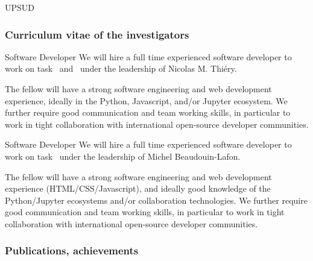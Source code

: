 \begin{sitedescription}{UPSUD}
\subsubsection*{Curriculum vitae of the investigators}





\begin{participant}[type=R,PM=21]{Software Developer}
  We will hire a full time experienced software developer to work on
  task~ and~ %
  under the leadership of Nicolas M. Thiéry.

  The fellow will have a strong software engineering and web
  development experience, ideally in the Python, Javascript, and/or
  Jupyter ecosystem. We further require good communication and team
  working skills, in particular to work in tight collaboration with
  international open-source developer communities.
\end{participant}

\begin{participant}[type=R,PM=12]{Software Developer}
  We will hire a full time experienced software developer to work
  on task~ %
  under the leadership of Michel Beaudouin-Lafon.

  The fellow will have a strong software engineering and web
  development experience (HTML/CSS/Javascript), and ideally 
  good knowledge of the Python/Jupyter ecosystems
  and/or collaboration technologies. 
  We further require good communication and team
  working skills, in particular to work in tight collaboration with
  international open-source developer communities.
\end{participant}


\subsubsection*{Publications, achievements}


\end{sitedescription}
